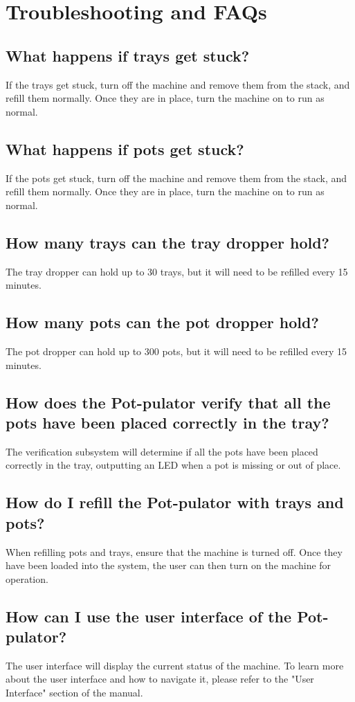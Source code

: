 \documentclass{article}
\begin{document}
\section{Troubleshooting and FAQs}
\subsection{What happens if trays get stuck?}
If the trays get stuck, turn off the machine and remove them from the stack, and refill them normally. Once they are in place, turn the machine on to run as normal.
\subsection{What happens if pots get stuck?}
If the pots get stuck, turn off the machine and remove them from the stack, and refill them normally. Once they are in place, turn the machine on to run as normal.
\subsection{How many trays can the tray dropper hold?}
The tray dropper can hold up to 30 trays, but it will need to be refilled every 15 minutes.
\subsection{How many pots can the pot dropper hold?}
The pot dropper can hold up to 300 pots, but it will need to be refilled every 15 minutes.
\subsection{How does the Pot-pulator verify that all the pots have been placed correctly in the tray?}
The verification subsystem will determine if all the pots have been placed correctly in the tray, outputting an LED when a pot is missing or out of place.
\subsection{How do I refill the Pot-pulator with trays and pots?}
When refilling pots and trays, ensure that the machine is turned off. Once they have been loaded into the system, the user can then turn on the machine for operation.
\subsection{How can I use the user interface of the Pot-pulator?}
The user interface will display the current status of the machine. To learn more about the user interface and how to navigate it, please refer to the "User Interface" section of the manual.
\end{document}
